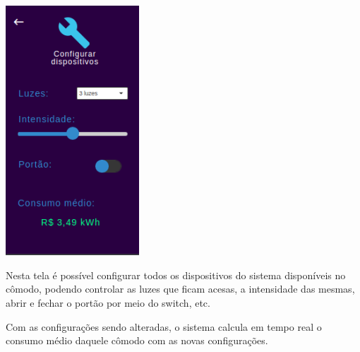 \begin{center}
\includegraphics[width=5cm]{figuras/5}
\end{center}

\par Nesta tela é possível configurar todos os dispositivos do sistema disponíveis no cômodo, podendo controlar as luzes que ficam acesas, a intensidade das mesmas, abrir e fechar o portão por meio do switch, etc.
\par Com as configurações sendo alteradas, o sistema calcula em tempo real o consumo médio daquele cômodo com as novas configurações.

